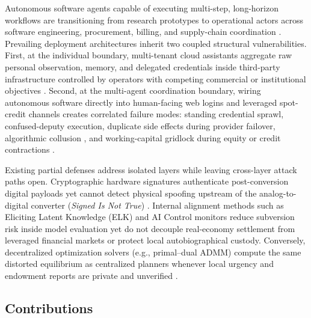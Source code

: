 \documentclass[11pt]{article}
\begin{document}
Autonomous software agents capable of executing multi-step, long-horizon workflows are transitioning from research prototypes to operational actors across software engineering, procurement, billing, and supply-chain coordination \citep{kwa2025horizon, morris2024levels}. Prevailing deployment architectures inherit two coupled structural vulnerabilities. First, at the individual boundary, multi-tenant cloud assistants aggregate raw personal observation, memory, and delegated credentials inside third-party infrastructure controlled by operators with competing commercial or institutional objectives \citep{balkin2016fiduciaries, clark1998extended}. Second, at the multi-agent coordination boundary, wiring autonomous software directly into human-facing web logins and leveraged spot-credit channels creates correlated failure modes: standing credential sprawl, confused-deputy execution, duplicate side effects during provider failover, algorithmic collusion \citep{cahyono2026sticky}, and working-capital gridlock during equity or credit contractions \citep{fleischman2026cycles}.

Existing partial defenses address isolated layers while leaving cross-layer attack paths open. Cryptographic hardware signatures authenticate post-conversion digital payloads yet cannot detect physical spoofing upstream of the analog-to-digital converter (\emph{Signed Is Not True}) \citep{fu2018sensors}. Internal alignment methods such as Eliciting Latent Knowledge (ELK) and AI Control monitors \citep{christiano2021elk, greenblatt2024control, kutasov2025shade} reduce subversion risk inside model evaluation yet do not decouple real-economy settlement from leveraged financial markets or protect local autobiographical custody. Conversely, decentralized optimization solvers (e.g., primal--dual ADMM) compute the same distorted equilibrium as centralized planners whenever local urgency and endowment reports are private and unverified \citep{hurwicz1972decentralized, myerson1983efficient}.

\subsection{Contributions}
\end{document}
